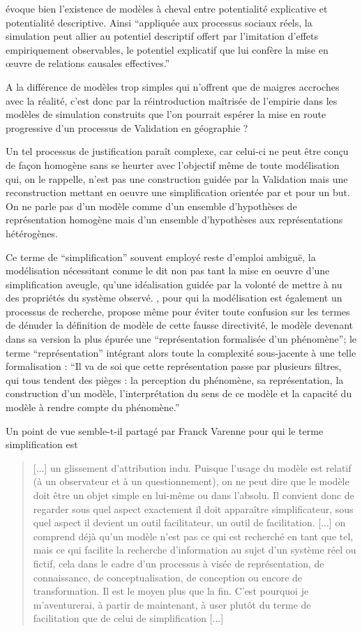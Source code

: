 \textcite{Bulle2005} évoque bien l'existence de modèles à cheval entre potentialité explicative et potentialité descriptive. Ainsi \enquote{appliquée aux processus sociaux réels, la simulation peut allier au potentiel descriptif offert par l’imitation d’effets empiriquement observables, le potentiel explicatif que lui confère la mise en œuvre de relations causales effectives.}

A la différence de modèles trop simples qui n'offrent que de maigres accroches avec la réalité, c'est donc par la réintroduction maîtrisée de l'empirie dans les modèles de simulation construits que l'on pourrait espérer la mise en route progressive d'un processus de Validation en géographie ?

Un tel processus de justification paraît complexe, car celui-ci ne peut être conçu de façon homogène sans se heurter avec l'objectif même de toute modélisation qui, on le rappelle, n'est pas une construction guidée par la Validation mais une reconstruction mettant en oeuvre une simplification orientée par et pour un but. On ne parle pas d'un modèle comme d'un ensemble d'hypothèses de représentation homogène mais d'un ensemble d'hypothèses aux représentations hétérogènes.

Ce terme de \enquote{simplification} souvent employé reste d'emploi ambiguë, la modélisation nécessitant comme le dit \textcite{Haggett1965} non pas tant la mise en oeuvre d'une simplification aveugle, qu'une idéalisation guidée par la volonté de mettre à nu des propriétés du système observé. \textcite{Brunet2000}, pour qui la modélisation est également un processus de recherche, propose même pour éviter toute confusion sur les termes de dénuder la définition de modèle de cette fausse directivité, le modèle devenant dans sa version la plus épurée une \enquote{représentation formalisée d'un phénomène}; le terme \enquote{représentation} intégrant alors toute la complexité sous-jacente à une telle formalisation : \enquote{Il va de soi que cette représentation passe par plusieurs filtres, qui tous tendent des pièges : la perception du phénomène, sa représentation, la construction d'un modèle, l'interprétation du sens de ce modèle et la capacité du modèle à rendre compte du phénomène.}

Un point de vue semble-t-il partagé par Franck Varenne pour qui le terme simplification est \blockquote[{\cite{Varenne2008}}]{[...] un glissement d’attribution indu. Puisque l’usage du modèle est relatif (à un observateur et à un questionnement), on ne peut dire que le modèle doit être un objet simple en lui-même ou dans l’absolu. Il convient donc de regarder sous quel aspect exactement il doit apparaître simplificateur, sous quel aspect il devient un outil facilitateur, un outil de facilitation. [...] on comprend déjà qu’un modèle n’est pas ce qui est recherché en tant que tel, mais ce qui facilite la recherche d’information au sujet d’un système réel ou fictif, cela dans le cadre d’un processus à visée de représentation, de connaissance, de conceptualisation, de conception ou encore de transformation. Il est le moyen plus que la fin. C’est pourquoi je m’aventurerai, à partir de maintenant, à user plutôt du terme de facilitation que de celui de simplification [...]}.

